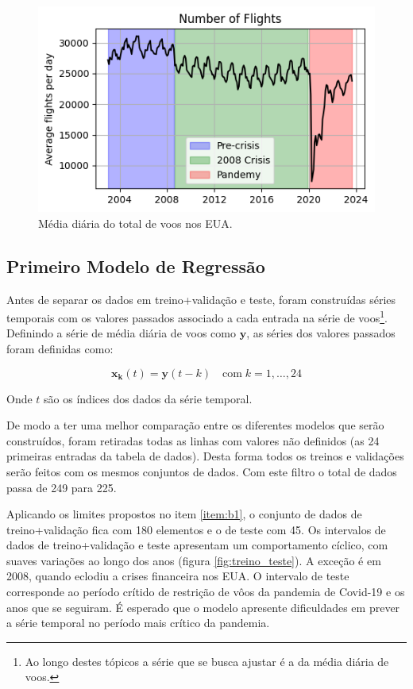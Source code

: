 \documentclass[final,5p]{elsarticle}
\numberwithin{equation}{section}
\begin{document}
    \begin{figure}[hbt!]
        \includegraphics[width=0.95\columnwidth]{A_NewSeries.png}
        \caption{Média diária do total de voos nos EUA.}
        \label{fig:serie_alternativa}
    \end{figure}

    \subsection{Primeiro Modelo de Regressão}

    Antes de separar os dados em treino+validação e teste, foram construídas séries temporais com os valores passados associado a cada entrada na série de voos\footnote{Ao longo destes tópicos a série que se busca ajustar é a da média diária de voos.}. Definindo a série de média diária de voos como $\textbf{y}$, as séries dos valores passados foram definidas como:

    \begin{equation}
        \textbf{x}_{\textbf{k}}(t) = \textbf{y}(t-k) \quad \text{com} \; k=1,\ldots,24 \label{eq:definicao_xs}
    \end{equation}

    \noindent Onde $t$ são os índices dos dados da série temporal.

    De modo a ter uma melhor comparação entre os diferentes modelos que serão construídos, foram retiradas todas as linhas com valores não definidos (as 24 primeiras entradas da tabela de dados). Desta forma todos os treinos e validações serão feitos com os mesmos conjuntos de dados. Com este filtro o total de dados passa de 249 para 225.

    Aplicando os limites propostos no item \ref{item:b1}, o conjunto de dados de treino+validação fica com 180 elementos e o de teste com 45. Os intervalos de dados de treino+validação e teste apresentam um comportamento cíclico, com suaves variações ao longo dos anos (figura \ref{fig:treino_teste}). A exceção é em 2008, quando eclodiu a crises financeira nos EUA. O intervalo de teste corresponde ao período crítido de restrição de vôos da pandemia de Covid-19 e os anos que se seguiram. É esperado que o modelo apresente dificuldades em prever a série temporal no período mais crítico da pandemia.
\end{document}
